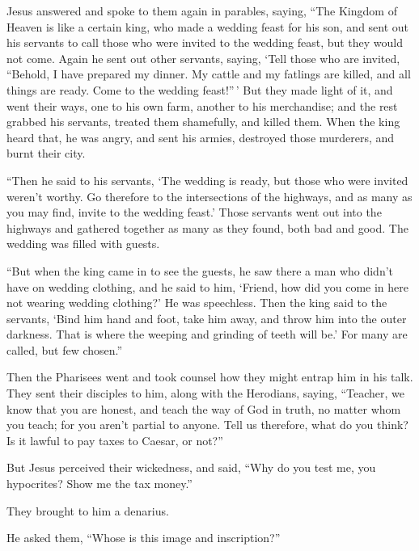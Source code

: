  Jesus answered and spoke to them again in parables,
saying,  ``The Kingdom of Heaven is like a certain king,
who made a wedding feast for his son,  and sent out his
servants to call those who were invited to the wedding feast, but they
would not come.  Again he sent out other servants, saying,
`Tell those who are invited, ``Behold, I have prepared my dinner. My
cattle and my fatlings are killed, and all things are ready. Come to the
wedding feast!''\,'  But they made light of it, and went
their ways, one to his own farm, another to his merchandise;
 and the rest grabbed his servants, treated them
shamefully, and killed them.  When the king heard that, he
was angry, and sent his armies, destroyed those murderers, and burnt
their city.

 ``Then he said to his servants, `The wedding is ready,
but those who were invited weren't worthy.  Go therefore
to the intersections of the highways, and as many as you may find,
invite to the wedding feast.'  Those servants went out
into the highways and gathered together as many as they found, both bad
and good. The wedding was filled with guests.

 ``But when the king came in to see the guests, he saw
there a man who didn't have on wedding clothing,  and he
said to him, `Friend, how did you come in here not wearing wedding
clothing?' He was speechless.  Then the king said to the
servants, `Bind him hand and foot, take him away, and throw him into the
outer darkness. That is where the weeping and grinding of teeth will
be.'  For many are called, but few chosen.''

 Then the Pharisees went and took counsel how they might
entrap him in his talk.  They sent their disciples to
him, along with the Herodians, saying, ``Teacher, we know that you are
honest, and teach the way of God in truth, no matter whom you teach; for
you aren't partial to anyone.  Tell us therefore, what do
you think? Is it lawful to pay taxes to Caesar, or not?''

 But Jesus perceived their wickedness, and said, ``Why do
you test me, you hypocrites?  Show me the tax money.''

They brought to him a denarius.

 He asked them, ``Whose is this image and inscription?''

